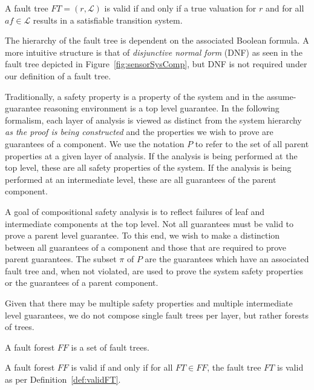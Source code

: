 \begin{definition} 
A fault tree $FT = (r, \mathcal{L})$ is valid if and only if a true valuation for $r$ and for all $\mathit{af} \in \mathcal{L}$ results in a satisfiable transition system. 
\label{def:validFT}
\end{definition}

The hierarchy of the fault tree is dependent on the associated Boolean formula. A more intuitive structure is that of {\em disjunctive normal form} (DNF) as seen in the fault tree depicted in Figure~\ref{fig:sensorSysComp}, but DNF is not required under our definition of a fault tree. 

Traditionally, a safety property is a property of the system and in the assume-guarantee reasoning environment is a top level guarantee. In the following formalism, each layer of analysis is viewed as distinct from the system hierarchy {\em as the proof is being constructed} and the properties we wish to prove are guarantees of a component. We use the notation $P$ to refer to the set of all parent properties at a given layer of analysis. If the analysis is being performed at the top level, these are all safety properties of the system. If the analysis is being performed at an intermediate level, these are all guarantees of the parent component.

A goal of compositional safety analysis is to reflect failures of leaf and intermediate components at the top level. Not all guarantees must be valid to prove a parent level guarantee. To this end, we wish to make a distinction between all guarantees of a component and those that are required to prove parent guarantees. The subset $\pi$ of $P$ are the guarantees which have an associated fault tree and, when not violated, are used to prove the system safety properties or the guarantees of a parent component. 

Given that there may be multiple safety properties and multiple intermediate level guarantees, we do not compose single fault trees per layer, but rather forests of trees.

\begin{definition}
A fault forest $\mathit{FF}$ is a set of fault trees.
\end{definition}

\begin{definition}
A fault forest $\mathit{FF}$ is valid if and only if for all $\mathit{FT} \in \mathit{FF}$, the fault tree $\mathit{FT}$ is valid as per Definition~\ref{def:validFT}.
\label{def:validFF}
\end{definition}


